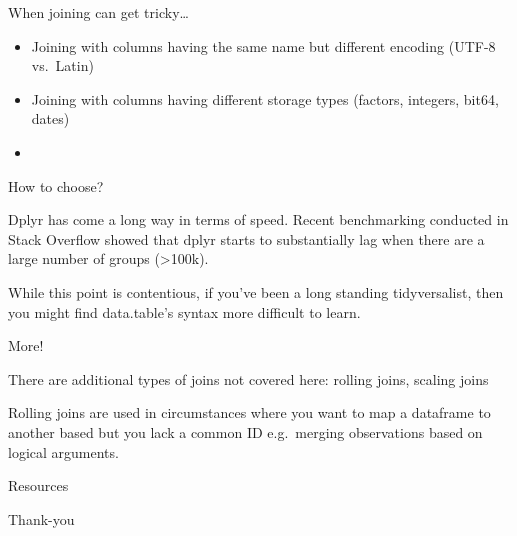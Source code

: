 \documentclass[ignorenonframetext,]{beamer}
\begin{document}
\begin{frame}{When joining can get tricky\ldots{}}

\begin{itemize}
\item
  Joining with columns having the same name but different encoding
  (UTF-8 vs.~Latin)
\item
  Joining with columns having different storage types (factors,
  integers, bit64, dates)
\item
\end{itemize}

\end{frame}

\begin{frame}{How to choose?}

Dplyr has come a long way in terms of speed. Recent benchmarking
conducted in Stack Overflow showed that dplyr starts to substantially
lag when there are a large number of groups (\textgreater{}100k).

While this point is contentious, if you've been a long standing
tidyversalist, then you might find data.table's syntax more difficult to
learn.

\end{frame}

\begin{frame}{More!}

There are additional types of joins not covered here: rolling joins,
scaling joins

Rolling joins are used in circumstances where you want to map a
dataframe to another based but you lack a common ID e.g.~merging
observations based on logical arguments.

Resources

\end{frame}

\begin{frame}{Thank-you}

\end{frame}
\end{document}
